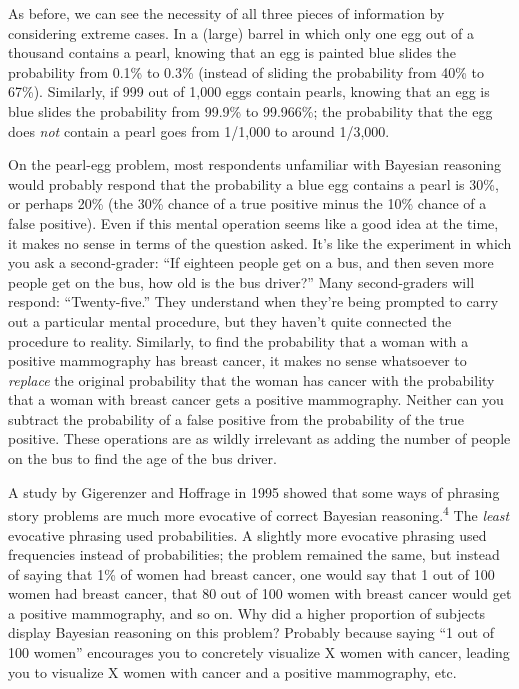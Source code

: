 {
 As before, we can see the necessity of all three pieces of
information by considering extreme cases. In a (large) barrel in which
only one egg out of a thousand contains a pearl, knowing that an egg is
painted blue slides the probability from 0.1\% to 0.3\% (instead of
sliding the probability from 40\% to 67\%). Similarly, if 999 out of
1,000 eggs contain pearls, knowing that an egg is blue slides the
probability from 99.9\% to 99.966\%; the probability that the egg does
\textit{not} contain a pearl goes from 1/1,000 to around 1/3,000.}

{
 On the pearl-egg problem, most respondents unfamiliar with
Bayesian reasoning would probably respond that the probability a blue
egg contains a pearl is 30\%, or perhaps 20\% (the 30\% chance of a
true positive minus the 10\% chance of a false positive). Even if this
mental operation seems like a good idea at the time, it makes no sense
in terms of the question asked. It's like the
experiment in which you ask a second-grader: ``If
eighteen people get on a bus, and then seven more people get on the
bus, how old is the bus driver?'' Many second-graders
will respond: ``Twenty-five.'' They
understand when they're being prompted to carry out a
particular mental procedure, but they haven't quite
connected the procedure to reality. Similarly, to find the probability
that a woman with a positive mammography has breast cancer, it makes no
sense whatsoever to \textit{replace} the original probability that the
woman has cancer with the probability that a woman with breast cancer
gets a positive mammography. Neither can you subtract the probability
of a false positive from the probability of the true positive. These
operations are as wildly irrelevant as adding the number of people on
the bus to find the age of the bus driver.}

{
 A study by Gigerenzer and Hoffrage in 1995 showed that some ways
of phrasing story problems are much more evocative of correct Bayesian
reasoning.\textsuperscript{4} The \textit{least} evocative phrasing
used probabilities. A slightly more evocative phrasing used frequencies
instead of probabilities; the problem remained the same, but instead of
saying that 1\% of women had breast cancer, one would say that 1 out of
100 women had breast cancer, that 80 out of 100 women with breast
cancer would get a positive mammography, and so on. Why did a higher
proportion of subjects display Bayesian reasoning on this problem?
Probably because saying ``1 out of 100
women'' encourages you to concretely visualize X
women with cancer, leading you to visualize X women with cancer and a
positive mammography, etc.}


